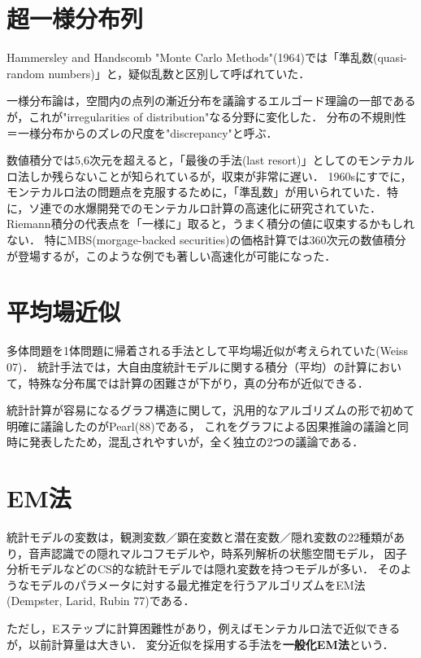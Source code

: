 \documentclass[uplatex,dvipdfmx]{jsreport}
\begin{document}
\section{超一様分布列}

\begin{history}
    Hammersley and Handscomb "Monte Carlo Methods"(1964)では「準乱数(quasi-random numbers)」と，疑似乱数と区別して呼ばれていた．

    一様分布論は，空間内の点列の漸近分布を議論するエルゴード理論の一部であるが，これが"irregularities of distribution"なる分野に変化した．
    分布の不規則性＝一様分布からのズレの尺度を"discrepancy"と呼ぶ．

    数値積分では5,6次元を超えると，「最後の手法(last resort)」としてのモンテカルロ法しか残らないことが知られているが，収束が非常に遅い．
    1960sにすでに，モンテカルロ法の問題点を克服するために，「準乱数」が用いられていた．特に，ソ連での水爆開発でのモンテカルロ計算の高速化に研究されていた．
    Riemann積分の代表点を「一様に」取ると，うまく積分の値に収束するかもしれない．
    特にMBS(morgage-backed securities)の価格計算では360次元の数値積分が登場するが，このような例でも著しい高速化が可能になった．
\end{history}

\section{平均場近似}

\begin{history}
    多体問題を1体問題に帰着される手法として平均場近似が考えられていた(Weiss 07)．
    統計手法では，大自由度統計モデルに関する積分（平均）の計算において，特殊な分布属では計算の困難さが下がり，真の分布が近似できる．

    統計計算が容易になるグラフ構造に関して，汎用的なアルゴリズムの形で初めて明確に議論したのがPearl(88)である，
    これをグラフによる因果推論の議論と同時に発表したため，混乱されやすいが，全く独立の2つの議論である．

\end{history}

\section{EM法}

\begin{discussion}
    統計モデルの変数は，観測変数／顕在変数と潜在変数／隠れ変数の22種類があり，音声認識での隠れマルコフモデルや，時系列解析の状態空間モデル，
    因子分析モデルなどのCS的な統計モデルでは隠れ変数を持つモデルが多い．
    そのようなモデルのパラメータに対する最尤推定を行うアルゴリズムをEM法(Dempster, Larid, Rubin 77)である．

    ただし，Eステップに計算困難性があり，例えばモンテカルロ法で近似できるが，以前計算量は大きい．
    変分近似を採用する手法を\textbf{一般化EM法}という．
\end{discussion}
\end{document}
